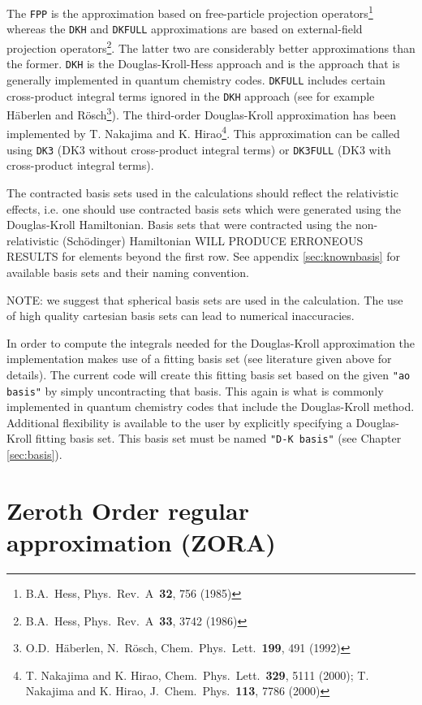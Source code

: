 The \verb+FPP+ is the approximation based on free-particle projection 
operators\footnote{B.A.~Hess, Phys.~Rev.~A~{\bf 32}, 756 (1985)} whereas the 
\verb+DKH+ and \verb+DKFULL+ approximations are based on external-field 
projection operators\footnote{B.A.~Hess, Phys.~Rev.~A~{\bf 33}, 3742 (1986)}.
The latter two are considerably better approximations than the former. \verb+DKH+ 
is the Douglas-Kroll-Hess approach and is the approach that is generally 
implemented in quantum chemistry codes. \verb+DKFULL+ includes certain 
cross-product integral terms ignored in the \verb+DKH+ approach (see for example 
H\"{a}berlen and R\"{o}sch\footnote{O.D.~H\"{a}berlen, N.~R\"{o}sch, 
Chem.~Phys.~Lett.~{\bf 199}, 491 (1992)}). The third-order Douglas-Kroll 
approximation has been implemented by T. Nakajima and K. Hirao\footnote{T. Nakajima 
and K. Hirao, Chem.~Phys.~Lett.~{\bf 329}, 5111 (2000); T. Nakajima and K. Hirao, 
J.~Chem.~Phys.~{\bf 113}, 7786 (2000)}. This approximation can be called using
\verb+DK3+ (DK3 without cross-product integral terms) or \verb+DK3FULL+ (DK3 with
cross-product integral terms).

The contracted basis sets used in the calculations should reflect the relativistic
effects, i.e. one should use contracted basis sets which were generated using the 
Douglas-Kroll Hamiltonian. Basis sets that were contracted using the 
non-relativistic (Sch\"{o}dinger) Hamiltonian WILL PRODUCE ERRONEOUS RESULTS for
elements beyond the first row. See appendix \ref{sec:knownbasis} for available
basis sets and their naming convention.

NOTE: we suggest that spherical basis sets are used in the calculation. The use of 
high quality cartesian basis sets can lead to numerical inaccuracies.

In order to compute the integrals needed for the Douglas-Kroll approximation
the implementation makes use of a fitting basis set (see literature given
above for details). The current code will create this fitting basis set
based on the given {\tt "ao basis"} by simply uncontracting that basis. This
again is what is commonly implemented in quantum chemistry codes that
include the Douglas-Kroll method.  Additional flexibility is available to
the user by explicitly specifying a Douglas-Kroll fitting basis
set. This basis set must be named {\tt "D-K basis"} (see Chapter
\ref{sec:basis}).

\section{Zeroth Order regular approximation (ZORA)}
\label{sec:zora}

